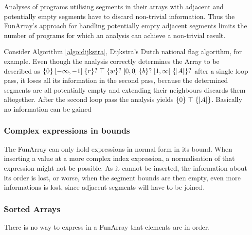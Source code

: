  Analyses of programs utilising segments in their arrays with adjacent and potentially empty segments have to discard non-trivial information. Thus the FunArray's approach for handling potentially empty adjacent segments limits the number of programs for which an analysis can achieve a non-trivial result.
 
 Consider Algorithm \ref{algo:dijkstra}, Dijkstra's Dutch national flag algorithm, for example. Even though the analysis correctly determines the Array to be described as $\{0\} \;[-\infty, -1]\; \{r\}? \;\top\; \{w\}? \;[0, 0]\; \{b\}? \;[1, \infty]\;  \{|A|\}?$ after a single loop pass, it loses all its information in the second pass, because the determined segments are all potentially empty and extending their neighbours discards them altogether. After the second loop pass the analysis yields $\{0\} \;\top\; \{|A|\}$. Basically no information can be gained   
 
\subsubsection{Complex expressions in bounds}

The FunArray can only hold expressions in normal form in its bound. When inserting a value at a more complex index expression, a normalisation of that expression might not be possible. As it cannot be inserted, the information about its order is lost, or worse, when the segment bounds are then empty, even more informations is lost, since adjacent segments will have to be joined. 

\subsubsection{Sorted Arrays}

There is no way to express in a FunArray that elements are in order. 
 

